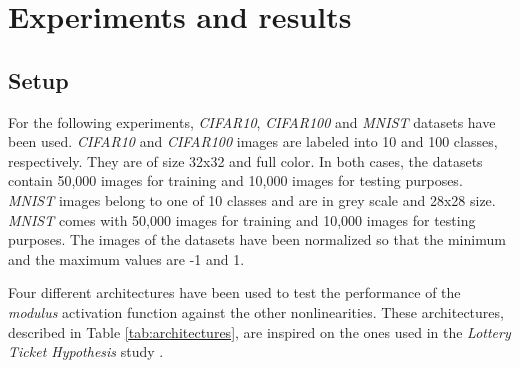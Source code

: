 \begin{itemize}
\end{itemize}

\section{Experiments and results} \label{sec:modulus_experiments}
\subsection{Setup}



For the following experiments, \textit{CIFAR10}, \textit{CIFAR100} \autocite{krizhevsky09} and \textit{MNIST} \autocite{lecun2010} datasets have been used. \textit{CIFAR10} and \textit{CIFAR100} images are labeled into 10 and 100 classes, respectively. They are of size 32x32 and full color. In both cases, the datasets contain 50,000 images for training and 10,000 images for testing purposes. \textit{MNIST} images belong to one of 10 classes and are in grey scale and 28x28 size. \textit{MNIST} comes with 50,000 images for training and 10,000 images for testing purposes. The images of the datasets have been normalized so that the minimum and the maximum values are -1 and 1. 

Four different architectures have been used to test the performance of the \textit{modulus} activation function against the other nonlinearities. These architectures, described in Table \ref{tab:architectures}, are inspired on the ones used in the \textit{Lottery Ticket Hypothesis} study \autocite{frankleC19}.



